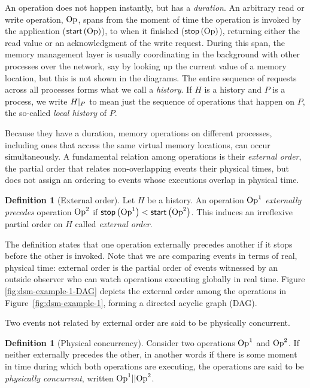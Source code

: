 \documentclass[]             %
{NASA}                       %
\theoremstyle{definition}
\newtheorem{definition}[theorem]{Definition}
\begin{document}
An operation does not happen instantly, but has a \emph{duration}. An
arbitrary read or write operation, $\mathrm{Op}$, spans from the moment of
time the operation is invoked by the application ($\mathsf{start}\left(\mathrm{Op}\right)$),
to when it finished ($\mathsf{stop}\left(\mathrm{Op}\right)$), returning either the read value
or an acknowledgment of the write request. During this span, the
memory management layer is usually coordinating in the background with
other processes over the network, say by looking up the current value
of a memory location, but this is not shown in the diagrams. The
entire sequence of requests across all processes forms what we call a
\emph{history}. If $H$ is a history and $P$ is a process, we write
$H|_{P}$ to mean just the sequence of operations that happen on $P$, the
so-called \emph{local history} of $P$.

Because they have a duration, memory operations on different
processes, including ones that access the same virtual memory
locations, can occur simultaneously. A fundamental relation among
operations is their \emph{external order}, the partial order that
relates non-overlapping events their physical times, but does not
assign an ordering to events whose executions overlap in physical
time.
\begin{definition}[External order]
  \label{def:external-order}
  Let $H$ be a history. An operation $\mathrm{Op}^1$ \emph{externally
    precedes} operation $\mathrm{Op}^2$ if
  $\mathsf{stop}\left(\mathrm{Op}^1\right) < \mathsf{start}\left(\mathrm{Op}^2\right)$. This induces an irreflexive
  partial order on $H$ called \emph{external order}.
\end{definition}
The definition states that one operation externally precedes another
if it stops before the other is invoked. Note that we are comparing
events in terms of real, physical time: external order is the partial
order of events witnessed by an outside observer who can watch
operations executing globally in real time. Figure
\ref{fig:dsm-example-1-DAG} depicts the external order among the
operations in Figure~\ref{fig:dsm-example-1}, forming a directed
acyclic graph (DAG).

Two events not related by external order are said to be physically
concurrent.

\begin{definition}[Physical concurrency]
  \label{def:physical-concurrency}
  Consider two operations $\mathrm{Op}^1$ and $\mathrm{Op}^2$. If neither externally
  precedes the other, in another words if there is some moment in time
  during which both operations are executing, the operations are said
  to be \emph{physically concurrent}, written $\mathrm{Op}^1 || \mathrm{Op}^2$.
\end{definition}
\end{document}

